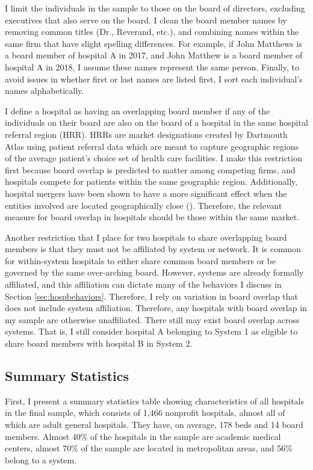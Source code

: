 \documentclass[12pt]{article}
\begin{document}
    I limit the individuals in the sample to those on the board of directors, excluding executives that also serve on the board. I clean the board member names by removing common titles (Dr., Reverand, etc.), and combining names within the same firm that have slight spelling differences. For example, if John Matthews is a board member of hospital A in 2017, and John Matthew is a board member of hospital A in 2018, I assume these names represent the same person. Finally, to avoid issues in whether first or last names are listed first, I sort each individual's names alphabetically. 

    I define a hospital as having an overlapping board member if any of the individuals on their board are also on the board of a hospital in the same hospital referral region (HRR). HRRs are market designations created by Dartmouth Atlas using patient referral data which are meant to capture geographic regions of the average patient's choice set of health care facilities. I make this restriction first because board overlap is predicted to matter among competing firms, and hospitals compete for patients within the same geographic region. Additionally, hospital mergers have been shown to have a more significant effect when the entities involved are located geographically close (\cite{cooper2019price}). Therefore, the relevant measure for board overlap in hospitals should be those within the same market. 

    Another restriction that I place for two hospitals to share overlapping board members is that they must not be affiliated by system or network. It is common for within-system hospitals to either share common board members or be governed by the same over-arching board. However, systems are already formally affiliated, and this affiliation can dictate many of the behaviors I discuss in Section \ref{sec:hospbehaviors}. Therefore, I rely on variation in board overlap that does not include system affiliation. Therefore, any hospitals with board overlap in my sample are otherwise unaffiliated. There still may exist board overlap across systems. That is, I still consider hospital A belonging to System 1 as eligible to share board members with hospital B in System 2. 


    \subsection{Summary Statistics}

    First, I present a summary statistics table showing characteristics of all hospitals in the final sample, which consists of 1,466 nonprofit hospitals, almost all of which are adult general hospitals. They have, on average, 178 beds and 14 board members. Almost 40\% of the hospitals in the sample are academic medical centers, almost 70\% of the sample are located in metropolitan areas, and 56\% belong to a system. 
\end{document}
